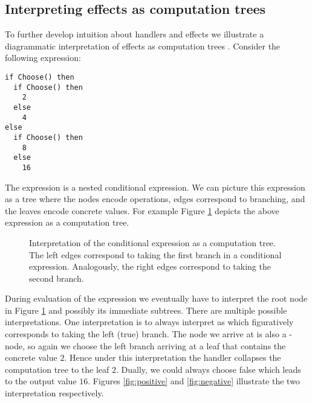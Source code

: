\subsection{Interpreting effects as computation trees}
To further develop intuition about handlers and effects we illustrate a diagrammatic interpretation of effects as computation trees \cite{Lindley2014}. Consider the following expression:
\begin{lstlisting}[style=ocaml]
if Choose() then
  if Choose() then
    2
  else
    4
else
  if Choose() then
    8
  else
    16 
\end{lstlisting}
The expression is a nested conditional expression.
We can picture this expression as a tree where the nodes encode operations, edges correspond to branching, and the leaves encode concrete values. For example Figure \ref{fig:condexp} depicts the above expression as a computation tree.
\begin{figure}[H]
\begin{center}
\end{center}\caption{Interpretation of the conditional expression as a computation tree. The left edges correspond to taking the first branch in a conditional expression. Analogously, the right edges correspond to taking the second branch.}\label{fig:condexp}
\end{figure}
During evaluation of the expression we eventually have to interpret the root node  in Figure \ref{fig:condexp} and possibly its immediate subtrees.
There are multiple possible interpretations. One interpretation is to always interpret  as  which figuratively corresponds to taking the left (true) branch. The node we arrive at is also a -node, so again we choose the left branch arriving at a leaf that contains the concrete value $2$. Hence under this interpretation the handler collapses the computation tree to the leaf $2$. Dually, we could always choose false which leads to the output value $16$. Figures \ref{fig:positive} and \ref{fig:negative} illustrate the two interpretation respectively.
